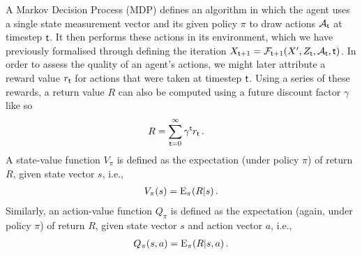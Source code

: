A Markov Decision Process (MDP) defines an algorithm in which the agent uses a single state measurement vector and its given policy $\pi$ to draw actions ${\cal A}_{\sf t}$ at timestep ${\sf t}$. It then performs these actions in its environment, which we have previously formalised through defining the iteration $X_{{\sf t}+1} = {\cal F}_{{\sf t}+1}(X',Z_{\sf t},{\cal A}_{\sf t},{\sf t})$. In order to assess the quality of an agent's actions, we might later attribute a reward value $r_{{\sf t}}$ for actions that were taken at timestep ${\sf t}$. Using a series of these rewards, a return value $R$ can also be computed using a future discount factor $\gamma$ like so 
\begin{align}
R &= \sum_{{\sf t}=0}^\infty \gamma^{\sf t}r_{\sf t} \,.
\end{align}
A state-value function $V_\pi$ is defined as the expectation (under policy $\pi$) of return $R$, given state vector $s$, i.e.,
\begin{align}
V_\pi (s) = {\rm E}_\pi (R\vert s) \,.
\end{align}
Similarly, an action-value function $Q_\pi$ is defined as the expectation (again, under policy $\pi$) of return $R$, given state vector $s$ and action vector $a$, i.e.,
\begin{align}
Q_\pi (s,a) = {\rm E}_\pi (R\vert s,a) \,.
\end{align}
